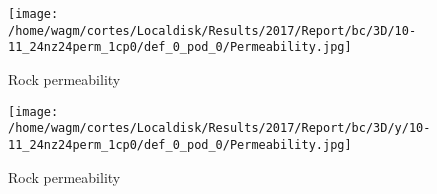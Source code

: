 \documentclass[12pt]{article}
\begin{document}
{\begin{figure}[!h] \hspace{-1cm}
\begin{minipage}{.5\textwidth}
 \centering
\texttt{[image: /home/wagm/cortes/Localdisk/Results/2017/Report/bc/3D/10-11\_24nz24perm\_1cp0/def\_0\_pod\_0/Permeability.jpg]}
\caption{Rock permeability}
\label{fig:rockperm3d1}
\end{minipage}%
\begin{minipage}{.5\textwidth}
 \centering
\texttt{[image: /home/wagm/cortes/Localdisk/Results/2017/Report/bc/3D/y/10-11\_24nz24perm\_1cp0/def\_0\_pod\_0/Permeability.jpg]}
\caption{Rock permeability}
\label{fig:rockperm3d2}
\end{minipage}%
\end{figure}


}
\end{document}
